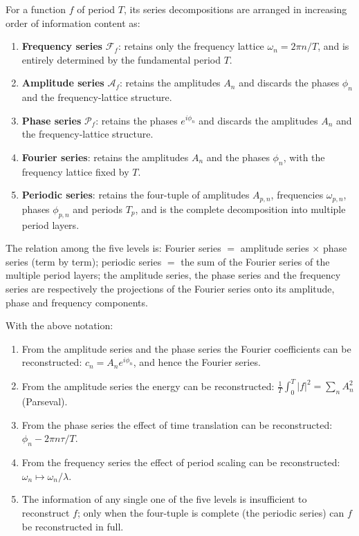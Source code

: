 \begin{definition}\label{def:series_five_layers}
For a function $f$ of period $T$, its series decompositions are arranged in increasing order of information content as:
\begin{enumerate}[label=(\roman*)]
    \item \textbf{Frequency series} $\mathcal{F}_f$: retains only the frequency lattice $\omega_n=2\pi n/T$, and is entirely determined by the fundamental period $T$.
    \item \textbf{Amplitude series} $\mathcal{A}_f$: retains the amplitudes $A_n$ and discards the phases $\phi_n$ and the frequency-lattice structure.
    \item \textbf{Phase series} $\mathcal{P}_f$: retains the phases $e^{i\phi_n}$ and discards the amplitudes $A_n$ and the frequency-lattice structure.
    \item \textbf{Fourier series}: retains the amplitudes $A_n$ and the phases $\phi_n$, with the frequency lattice fixed by $T$.
    \item \textbf{Periodic series}: retains the four-tuple of amplitudes $A_{p,n}$, frequencies $\omega_{p,n}$, phases $\phi_{p,n}$ and periods $T_p$, and is the complete decomposition into multiple period layers.
\end{enumerate}
The relation among the five levels is: Fourier series $=$ amplitude series $\times$ phase series (term by term); periodic series $=$ the sum of the Fourier series of the multiple period layers; the amplitude series, the phase series and the frequency series are respectively the projections of the Fourier series onto its amplitude, phase and frequency components.
\end{definition}

\begin{proposition}\label{prop:series_five_layers_reconstruction}
With the above notation:
\begin{enumerate}[label=(\roman*)]
    \item From the amplitude series and the phase series the Fourier coefficients can be reconstructed: $c_n=A_n e^{i\phi_n}$, and hence the Fourier series.
    \item From the amplitude series the energy can be reconstructed: $\frac{1}{T}\int_0^T |f|^2=\sum_n A_n^2$ (Parseval).
    \item From the phase series the effect of time translation can be reconstructed: $\phi_n-2\pi n\tau/T$.
    \item From the frequency series the effect of period scaling can be reconstructed: $\omega_n\mapsto \omega_n/\lambda$.
    \item The information of any single one of the five levels is insufficient to reconstruct $f$; only when the four-tuple is complete (the periodic series) can $f$ be reconstructed in full.
\end{enumerate}
\end{proposition}

